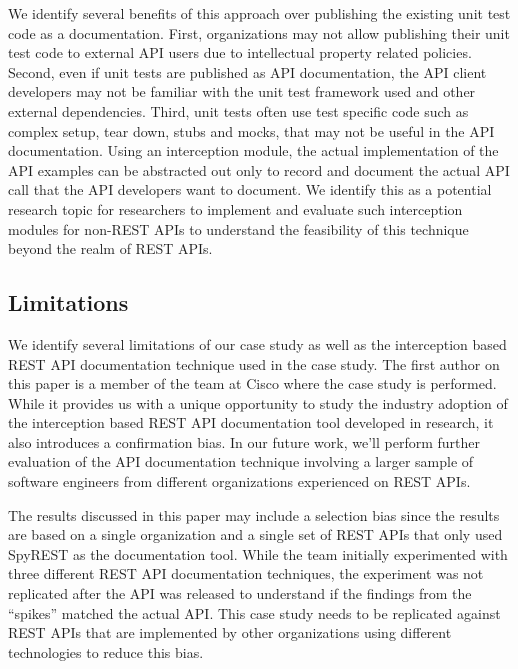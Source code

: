 \documentclass[10pt, conference]{IEEEtran}
\begin{document}
We identify several benefits of this approach over publishing the existing unit test code as a documentation. First, organizations may not allow publishing their unit test code to external API users due to intellectual property related policies. Second, even if unit tests are published as API documentation, the API client developers may not be familiar with the unit test framework used and other external dependencies. Third, unit tests often use test specific code such as complex setup, tear down, stubs and mocks, that may not be useful in the API documentation. Using an interception module, the actual implementation of the API examples can be abstracted out only to record and document the actual API call that the API developers want to document. We identify this as a potential research topic for researchers to implement and evaluate such interception modules for non-REST APIs to understand the feasibility of this technique beyond the realm of REST APIs.

\subsection{Limitations} %

We identify several limitations of our case study as well as the interception based REST API documentation technique used in the case study. The first author on this paper is a member of the team at Cisco where the case study is performed. While it provides us with a unique opportunity to study the industry adoption of the interception based REST API documentation tool developed in research, it also introduces a confirmation bias. In our future work, we'll perform further evaluation of the API documentation technique involving a larger sample of software engineers from different organizations experienced on REST APIs.

The results discussed in this paper may include a selection bias since the results are based on a single organization and a single set of REST APIs that only used SpyREST as the documentation tool. While the team initially experimented with three different REST API documentation techniques, the experiment was not replicated after the API was released to understand if the findings from the ``spikes'' matched the actual API. This case study needs to be replicated against REST APIs that are implemented by other organizations using different technologies to reduce this bias.
\end{document}
